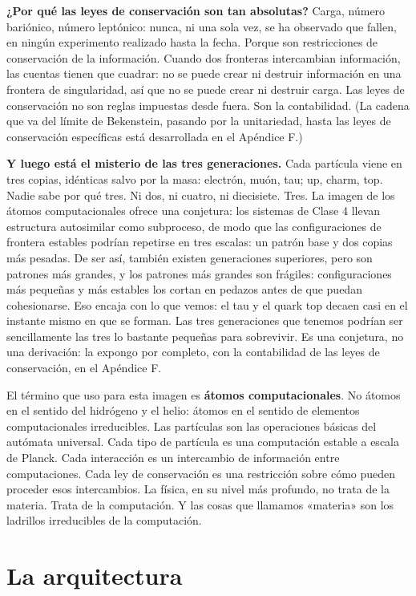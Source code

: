\documentclass[11pt, twoside, openright]{book}
\begin{document}
\textbf{¿Por qué las leyes de conservación son tan absolutas?} Carga, número bariónico, número leptónico: nunca, ni una sola vez, se ha observado que fallen, en ningún experimento realizado hasta la fecha. Porque son restricciones de conservación de la información. Cuando dos fronteras intercambian información, las cuentas tienen que cuadrar: no se puede crear ni destruir información en una frontera de singularidad, así que no se puede crear ni destruir carga. Las leyes de conservación no son reglas impuestas desde fuera. Son la contabilidad. (La cadena que va del límite de Bekenstein, pasando por la unitariedad, hasta las leyes de conservación específicas está desarrollada en el Apéndice F.)

\textbf{Y luego está el misterio de las tres generaciones.} Cada partícula viene en tres copias, idénticas salvo por la masa: electrón, muón, tau; up, charm, top. Nadie sabe por qué tres. Ni dos, ni cuatro, ni diecisiete. Tres. La imagen de los átomos computacionales ofrece una conjetura: los sistemas de Clase 4 llevan estructura autosimilar como subproceso, de modo que las configuraciones de frontera estables podrían repetirse en tres escalas: un patrón base y dos copias más pesadas. De ser así, también existen generaciones superiores, pero son patrones más grandes, y los patrones más grandes son frágiles: configuraciones más pequeñas y más estables los cortan en pedazos antes de que puedan cohesionarse. Eso encaja con lo que vemos: el tau y el quark top decaen casi en el instante mismo en que se forman. Las tres generaciones que tenemos podrían ser sencillamente las tres lo bastante pequeñas para sobrevivir. Es una conjetura, no una derivación: la expongo por completo, con la contabilidad de las leyes de conservación, en el Apéndice F.

El término que uso para esta imagen es \textbf{átomos computacionales}. No átomos en el sentido del hidrógeno y el helio: átomos en el sentido de elementos computacionales irreducibles. Las partículas son las operaciones básicas del autómata universal. Cada tipo de partícula es una computación estable a escala de Planck. Cada interacción es un intercambio de información entre computaciones. Cada ley de conservación es una restricción sobre cómo pueden proceder esos intercambios. La física, en su nivel más profundo, no trata de la materia. Trata de la computación. Y las cosas que llamamos «materia» son los ladrillos irreducibles de la computación.


\section*{La arquitectura}
\end{document}
